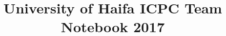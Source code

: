 \documentclass[10pt]{article}
\title{\vspace{-4ex}\Large{University of Haifa ICPC Team Notebook 2017}}
\author{}
\date{}
\begin{document}
\begin{landscape}
\begin{multicols}{2}

\maketitle
\vspace{-13ex}
\tableofcontents
\pagestyle{fancy}



\end{multicols}
\end{landscape}
\end{document}
